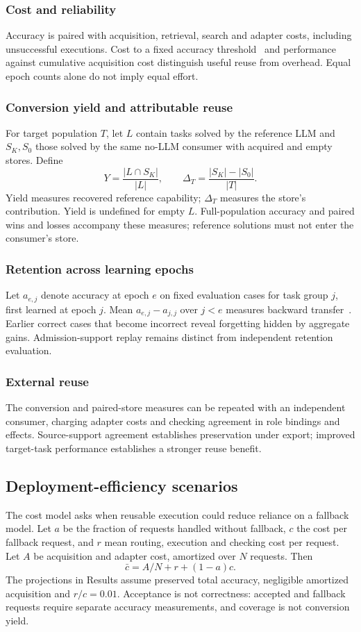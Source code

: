\documentclass[11pt]{article}
\begin{document}
\subsubsection{Cost and reliability}\label{measure:cost}
Accuracy is paired with acquisition, retrieval, search and adapter costs, including unsuccessful executions. Cost to a fixed accuracy threshold~\cite{transfer} and performance against cumulative acquisition cost distinguish useful reuse from overhead. Equal epoch counts alone do not imply equal effort.

\subsubsection{Conversion yield and attributable reuse}\label{measure:yield}
For target population $T$, let $L$ contain tasks solved by the reference LLM and $S_K,S_0$ those solved by the same no-LLM consumer with acquired and empty stores. Define
\[
Y=\frac{|L\cap S_K|}{|L|},\qquad
\Delta_T=\frac{|S_K|-|S_0|}{|T|}.
\]
Yield measures recovered reference capability; $\Delta_T$ measures the store's contribution. Yield is undefined for empty $L$. Full-population accuracy and paired wins and losses accompany these measures; reference solutions must not enter the consumer's store.

\subsubsection{Retention across learning epochs}\label{measure:back}
Let $a_{e,j}$ denote accuracy at epoch $e$ on fixed evaluation cases for task group $j$, first learned at epoch $j$. Mean $a_{e,j}-a_{j,j}$ over $j<e$ measures backward transfer~\cite{gem}. Earlier correct cases that become incorrect reveal forgetting hidden by aggregate gains. Admission-support replay remains distinct from independent retention evaluation.

\subsubsection{External reuse}\label{measure:external}
The conversion and paired-store measures can be repeated with an independent consumer, charging adapter costs and checking agreement in role bindings and effects. Source-support agreement establishes preservation under export; improved target-task performance establishes a stronger reuse benefit.

\subsection{Deployment-efficiency scenarios}\label{design:efficiency}
The cost model asks when reusable execution could reduce reliance on a fallback model. Let $a$ be the fraction of requests handled without fallback, $c$ the cost per fallback request, and $r$ mean routing, execution and checking cost per request. Let $A$ be acquisition and adapter cost, amortized over $N$ requests. Then
\[
\bar c=A/N+r+(1-a)c.
\]
The projections in Results assume preserved total accuracy, negligible amortized acquisition and $r/c=0.01$. Acceptance is not correctness: accepted and fallback requests require separate accuracy measurements, and coverage is not conversion yield.
\end{document}
